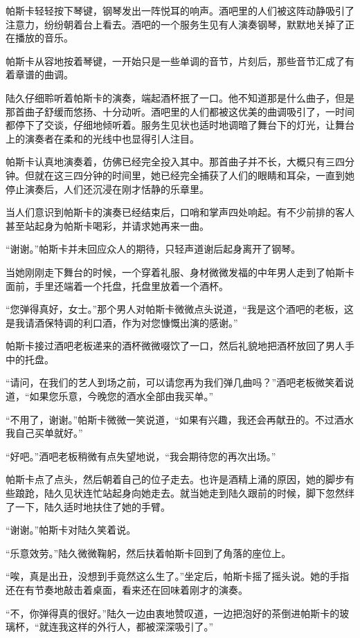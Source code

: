 帕斯卡轻轻按下琴键，钢琴发出一阵悦耳的响声。酒吧里的人们被这阵动静吸引了注意力，纷纷朝着台上看去。酒吧的一个服务生见有人演奏钢琴，默默地关掉了正在播放的音乐。

帕斯卡从容地按着琴键，一开始只是一些单调的音节，片刻后，那些音节汇成了有着章谱的曲调。

陆久仔细聆听着帕斯卡的演奏，端起酒杯抿了一口。他不知道那是什么曲子，但是那首曲子舒缓而悠扬、十分动听。酒吧里的人们都被这优美的曲调吸引了，一时间都停下了交谈，仔细地倾听着。服务生见状也适时地调暗了舞台下的灯光，让舞台上的演奏者在柔和的光线中也显得引人注目。

帕斯卡认真地演奏着，仿佛已经完全投入其中。那首曲子并不长，大概只有三四分钟。但就在这三四分钟的时间里，她已经完全捕获了人们的眼睛和耳朵，一直到她停止演奏后，人们还沉浸在刚才恬静的乐章里。

当人们意识到帕斯卡的演奏已经结束后，口哨和掌声四处响起。有不少前排的客人甚至站起身为帕斯卡喝彩，并请求她再来一曲。

“谢谢。”帕斯卡并未回应众人的期待，只轻声道谢后起身离开了钢琴。

当她刚刚走下舞台的时候，一个穿着礼服、身材微微发福的中年男人走到了帕斯卡面前，手里还端着一个托盘，托盘里放着一个酒杯。

“您弹得真好，女士。”那个男人对帕斯卡微微点头说道，“我是这个酒吧的老板，这是我请酒保特调的利口酒，作为对您慷慨出演的感谢。”

帕斯卡接过酒吧老板递来的酒杯微微啜饮了一口，然后礼貌地把酒杯放回了男人手中的托盘。

“请问，在我们的艺人到场之前，可以请您再为我们弹几曲吗？”酒吧老板微笑着说道，“如果您乐意，今晚您的酒水全部由我买单。”

“不用了，谢谢。”帕斯卡微微一笑说道，“如果有兴趣，我还会再献丑的。不过酒水我自己买单就好。”

“好吧。”酒吧老板稍微有点失望地说，“我会期待您的再次出场。”

帕斯卡点了点头，然后朝着自己的位子走去。也许是酒精上涌的原因，她的脚步有些踉跄，陆久见状连忙站起身向她走去。就当她走到陆久跟前的时候，脚下忽然绊了一下，陆久适时地扶住了她的手臂。

“谢谢。”帕斯卡对陆久笑着说。

“乐意效劳。”陆久微微鞠躬，然后扶着帕斯卡回到了角落的座位上。

“唉，真是出丑，没想到手竟然这么生了。”坐定后，帕斯卡摇了摇头说。她的手指还在有节奏地敲击着桌面，看来还在回味着刚才的演奏。

“不，你弹得真的很好。”陆久一边由衷地赞叹道，一边把泡好的茶倒进帕斯卡的玻璃杯，“就连我这样的外行人，都被深深吸引了。”

